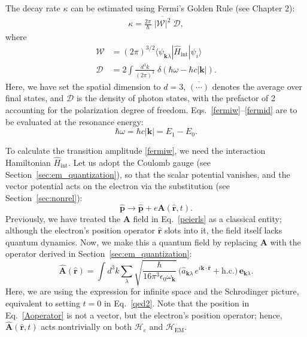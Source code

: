 \documentclass[prx,12pt]{revtex4-2}
\begin{document}
The decay rate $\kappa$ can be estimated using Fermi's Golden Rule
(see Chapter 2):
\begin{align}
  \kappa = \frac{2\pi}{\hbar} \;
  \overline{|\mathcal{W}|^2}  \;
  \mathcal{D},
  \label{newfermi}
\end{align}
where
\begin{align}
  \mathcal{W} &= (2\pi)^{3/2}
  \langle \psi_{\mathbf{k}\lambda} | \hat{H}_{\mathrm{int}}|\psi_i\rangle
  \label{fermiw} \\
  \mathcal{D} &= 2 \int \frac{d^3k}{(2\pi)^3} \;
  \delta(\hbar \omega-\hbar c |\mathbf{k}|).
  \label{fermid}
\end{align}
Here, we have set the spatial dimension to $d = 3$,
$\overline{(\cdots)}$ denotes the average over final states, and
$\mathcal{D}$ is the density of photon states, with the prefactor of 2
accounting for the polarization degree of freedom.
Eqs.~\eqref{fermiw}--\eqref{fermid} are to be evaluated at the
resonance energy:
\begin{equation}
  \hbar \omega = \hbar c|\mathbf{k}| = E_1 - E_0.
\end{equation}

To calculate the transition amplitude \eqref{fermiw}, we need the
interaction Hamiltonian $\hat{H}_{\mathrm{int}}$.  Let us adopt the
Coulomb gauge (see Section~\ref{sec:em_quantization}), so that the
scalar potential vanishes, and the vector potential acts on the
electron via the substitution (see Section~\ref{sec:nonrel}):
\begin{equation}
  \hat{\mathbf{p}} \rightarrow \hat{\mathbf{p}} +
  e\mathbf{A}(\hat{\mathbf{r}},t).
  \label{peierls}
\end{equation}
Previously, we have treated the $\mathbf{A}$ field in
Eq.~\eqref{peierls} as a classical entity; although the electron's
position operator $\hat{\mathbf{r}}$ slots into it, the field itself
lacks quantum dynamics.  Now, we make this a quantum field by
replacing $\mathbf{A}$ with the operator derived in
Section~\ref{sec:em_quantization}:
\begin{equation}
  \hat{\mathbf{A}}(\hat{\mathbf{r}}) =
  \int d^3k \sum_{\lambda} 
  \sqrt{\frac{\hbar}{16\pi^3\epsilon_0\omega_{\mathbf{k}}}}\,
  \Big(\hat{a}_{\mathbf{k}\lambda} \, e^{i\mathbf{k}\cdot\hat{\mathbf{r}}}
  + \mathrm{h.c.}\Big)\, \mathbf{e}_{\mathbf{k}\lambda}.
  \label{Aoperator}
\end{equation}
Here, we are using the expression for infinite space and the
Schrodinger picture, equivalent to setting $t = 0$ in
Eq.~\eqref{qed2}.  Note that the position in Eq.~\eqref{Aoperator} is
not a vector, but the electron's position operator; hence,
$\hat{\mathbf{A}}(\hat{\mathbf{r}},t)$ acts nontrivially on both
$\mathscr{H}_e$ and $\mathscr{H}_{\mathrm{EM}}$.
\end{document}
